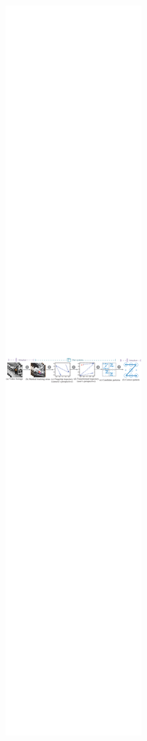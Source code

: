 \begin{figure}[!ht]
    \centering
    \includegraphics[width=\textwidth]{fig/overview.pdf}

\end{figure}
